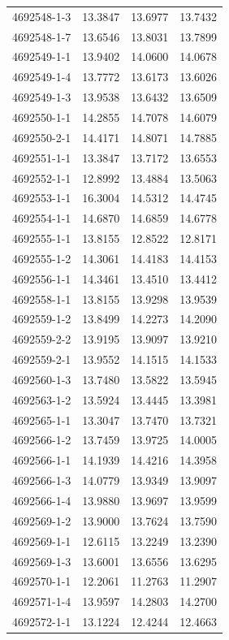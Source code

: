 \begin{longtable}{lrrr}
4692548-1-3 & 13.3847 & 13.6977 & 13.7432 \\
4692548-1-7 & 13.6546 & 13.8031 & 13.7899 \\
4692549-1-1 & 13.9402 & 14.0600 & 14.0678 \\
4692549-1-4 & 13.7772 & 13.6173 & 13.6026 \\
4692549-1-3 & 13.9538 & 13.6432 & 13.6509 \\
4692550-1-1 & 14.2855 & 14.7078 & 14.6079 \\
4692550-2-1 & 14.4171 & 14.8071 & 14.7885 \\
4692551-1-1 & 13.3847 & 13.7172 & 13.6553 \\
4692552-1-1 & 12.8992 & 13.4884 & 13.5063 \\
4692553-1-1 & 16.3004 & 14.5312 & 14.4745 \\
4692554-1-1 & 14.6870 & 14.6859 & 14.6778 \\
4692555-1-1 & 13.8155 & 12.8522 & 12.8171 \\
4692555-1-2 & 14.3061 & 14.4183 & 14.4153 \\
4692556-1-1 & 14.3461 & 13.4510 & 13.4412 \\
4692558-1-1 & 13.8155 & 13.9298 & 13.9539 \\
4692559-1-2 & 13.8499 & 14.2273 & 14.2090 \\
4692559-2-2 & 13.9195 & 13.9097 & 13.9210 \\
4692559-2-1 & 13.9552 & 14.1515 & 14.1533 \\
4692560-1-3 & 13.7480 & 13.5822 & 13.5945 \\
4692563-1-2 & 13.5924 & 13.4445 & 13.3981 \\
4692565-1-1 & 13.3047 & 13.7470 & 13.7321 \\
4692566-1-2 & 13.7459 & 13.9725 & 14.0005 \\
4692566-1-1 & 14.1939 & 14.4216 & 14.3958 \\
4692566-1-3 & 14.0779 & 13.9349 & 13.9097 \\
4692566-1-4 & 13.9880 & 13.9697 & 13.9599 \\
4692569-1-2 & 13.9000 & 13.7624 & 13.7590 \\
4692569-1-1 & 12.6115 & 13.2249 & 13.2390 \\
4692569-1-3 & 13.6001 & 13.6556 & 13.6295 \\
4692570-1-1 & 12.2061 & 11.2763 & 11.2907 \\
4692571-1-4 & 13.9597 & 14.2803 & 14.2700 \\
4692572-1-1 & 13.1224 & 12.4244 & 12.4663 \\

\end{longtable}
